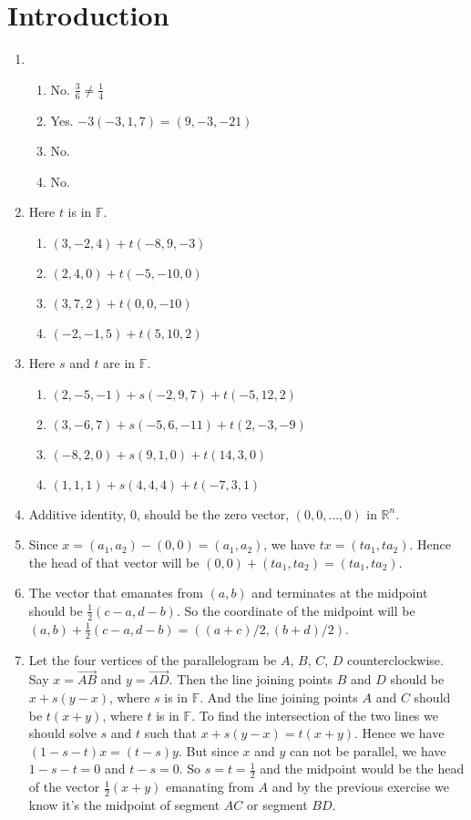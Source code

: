 \section{Introduction}
\begin{enumerate}
\item \begin{enumerate}
\item No. \(\frac{3}{6} \neq \frac{1}{4}\)
\item Yes. $-3(-3,1,7)=(9,-3,-21)$
\item No.
\item No.
\end{enumerate}
\item Here $t$ is in $\mathbb{F}$.

\begin{enumerate}
\item $(3,-2,4)+t(-8,9,-3)$
\item $(2,4,0)+t(-5,-10,0)$
\item $(3,7,2)+t(0,0,-10)$
\item $(-2,-1,5)+t(5,10,2)$
\end{enumerate}
\item Here $s$ and $t$ are in $\mathbb{F}$.

\begin{enumerate}
\item $(2,-5,-1)+s(-2,9,7)+t(-5,12,2)$
\item $(3,-6,7)+s(-5,6,-11)+t(2,-3,-9)$
\item $(-8,2,0)+s(9,1,0)+t(14,3,0)$
\item $(1,1,1)+s(4,4,4)+t(-7,3,1)$
\end{enumerate}
\item Additive identity, $0$, should be the zero vector, $(0,0,\dots ,0)$ in $\mathbb{R}^n $.
\item Since $x=(a_1,a_2)-(0,0)=(a_1,a_2)$, we have $tx=(ta_1,ta_2)$. Hence the head of that vector will be $(0,0)+(ta_1,ta_2)=(ta_1,ta_2)$.
\item The vector that emanates from $(a,b)$ and terminates at the midpoint should be $\frac{1}{2}(c-a,d-b)$. So the coordinate of the midpoint will be $(a,b)+\frac{1}{2}(c-a,d-b)=((a+c)/2,(b+d)/2)$.
\item Let the four vertices of the parallelogram be $A$, $B$, $C$, $D$ counterclockwise. Say $x=\vec{AB}$ and $y=\vec{AD}$. Then the line joining points $B$ and $D$ should be $x+s(y-x)$, where $s$ is in $\mathbb{F}$. And the line joining points $A$ and $C$ should be $t(x+y)$, where $t$ is in $\mathbb{F}$. To find the intersection of the two lines we should solve $s$ and $t$ such that $x+s(y-x)=t(x+y)$. Hence we have $(1-s-t)x=(t-s)y$. But since $x$ and $y$ can not be parallel, we have $1-s-t=0$ and $t-s=0$. So $s=t=\frac{1}{2}$ and the midpoint would be the head of the vector $\frac{1}{2}(x+y)$ emanating from $A$ and by the previous exercise we know it's the midpoint of segment $AC$ or segment $BD$.
\end{enumerate}